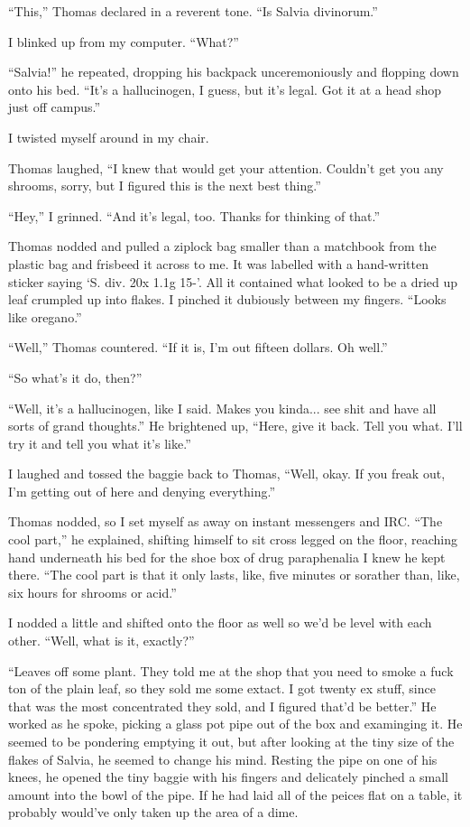``This,'' Thomas declared in a reverent tone.  ``Is Salvia divinorum.''

I blinked up from my computer.  ``What?''

``Salvia!'' he repeated, dropping his backpack unceremoniously and flopping down onto his bed.  ``It's a hallucinogen, I guess, but it's legal.  Got it at a head shop just off campus.''

I twisted myself around in my chair.

Thomas laughed, ``I knew that would get your attention.  Couldn't get you any shrooms, sorry, but I figured this is the next best thing.''

``Hey,'' I grinned.  ``And it's legal, too.  Thanks for thinking of that.''

Thomas nodded and pulled a ziplock bag smaller than a matchbook from the plastic bag and frisbeed it across to me.  It was labelled with a hand-written sticker saying `S. div. 20x 1.1g 15-'.  All it contained what looked to be a dried up leaf crumpled up into flakes.  I pinched it dubiously between my fingers. ``Looks like oregano.''

``Well,'' Thomas countered.  ``If it is, I'm out fifteen dollars.  Oh well.''

``So what's it do, then?''

``Well, it's a hallucinogen, like I said.  Makes you kinda... see shit and have all sorts of grand thoughts.''  He brightened up, ``Here, give it back.  Tell you what.  I'll try it and tell you what it's like.''

I laughed and tossed the baggie back to Thomas, ``Well, okay.  If you freak out, I'm getting out of here and denying everything.''

Thomas nodded, so I set myself as away on instant messengers and IRC.  ``The cool part,'' he explained, shifting himself to sit cross legged on the floor, reaching hand underneath his bed for the shoe box of drug paraphenalia I knew he kept there.  ``The cool part is that it only lasts, like, five minutes or sorather than, like, six hours for shrooms or acid.''

I nodded a little and shifted onto the floor as well so we'd be level with each other.  ``Well, what is it, exactly?''

``Leaves off some plant.  They told me at the shop that you need to smoke a fuck ton of the plain leaf, so they sold me some extact.  I got twenty ex stuff, since that was the most concentrated they sold, and I figured that'd be better.''  He worked as he spoke, picking a glass pot pipe out of the box and examinging it.  He seemed to be pondering emptying it out, but after looking at the tiny size of the flakes of Salvia, he seemed to change his mind.  Resting the pipe on one of his knees, he opened the tiny baggie with his fingers and delicately pinched a small amount into the bowl of the pipe.  If he had laid all of the peices flat on a table, it probably would've only taken up the area of a dime.

